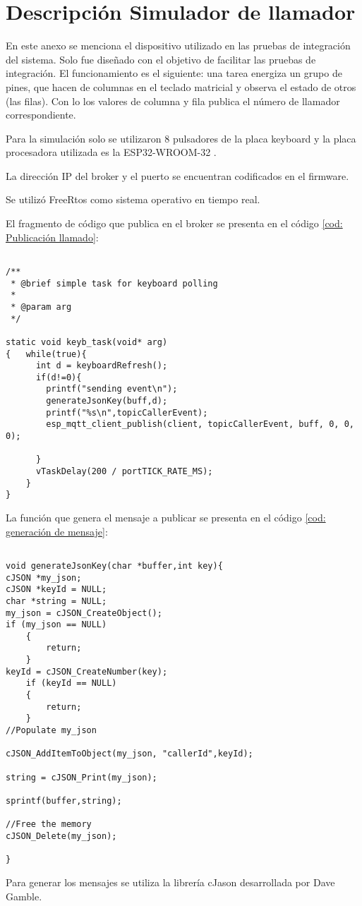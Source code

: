
\chapter{Descripción Simulador de llamador} %

\label{AppendixA} %

En este anexo se menciona el dispositivo utilizado en las pruebas de integración del sistema. Solo fue diseñado con el objetivo de facilitar las pruebas de integración. El funcionamiento es el siguiente: una tarea energiza un grupo de pines, que hacen de columnas en el teclado matricial y observa el estado de otros (las filas). Con lo los valores de columna y fila publica el número de llamador correspondiente. 

Para la simulación solo se utilizaron 8 pulsadores de la placa keyboard  \citep{WEBSITE:37} y la placa procesadora utilizada es la ESP32-WROOM-32 \citep{WEBSITE:38}. 

La dirección IP del broker y el puerto se encuentran codificados en el firmware.

Se utilizó FreeRtos \citep{WEBSITE:40} como sistema operativo en tiempo real.

El fragmento de código que publica en el broker se presenta en el código \ref{cod: Publicación llamado}:

\begin{lstlisting}[label=cod: Publicación llamado,caption=Tarea que publica en el broker la simulación de la llamada.]

/**
 * @brief simple task for keyboard polling
 * 
 * @param arg 
 */

static void keyb_task(void* arg)
{   while(true){
      int d = keyboardRefresh();
      if(d!=0){
        printf("sending event\n");
        generateJsonKey(buff,d);
        printf("%s\n",topicCallerEvent);
        esp_mqtt_client_publish(client, topicCallerEvent, buff, 0, 0, 0);

      }
      vTaskDelay(200 / portTICK_RATE_MS);
    }
}
\end{lstlisting}

La función que genera el mensaje a publicar se presenta en el código \ref{cod: generación de mensaje}:

\begin{lstlisting}[label=cod: generación de mensaje,caption= Función que genera el payload.]

void generateJsonKey(char *buffer,int key){
cJSON *my_json;
cJSON *keyId = NULL;
char *string = NULL;    
my_json = cJSON_CreateObject();
if (my_json == NULL)
    {
        return;
    }
keyId = cJSON_CreateNumber(key);
    if (keyId == NULL)
    {
        return;
    }    
//Populate my_json

cJSON_AddItemToObject(my_json, "callerId",keyId);

string = cJSON_Print(my_json);

sprintf(buffer,string);

//Free the memory
cJSON_Delete(my_json);

}

\end{lstlisting}

Para generar los mensajes se utiliza la librería cJason desarrollada por Dave Gamble.